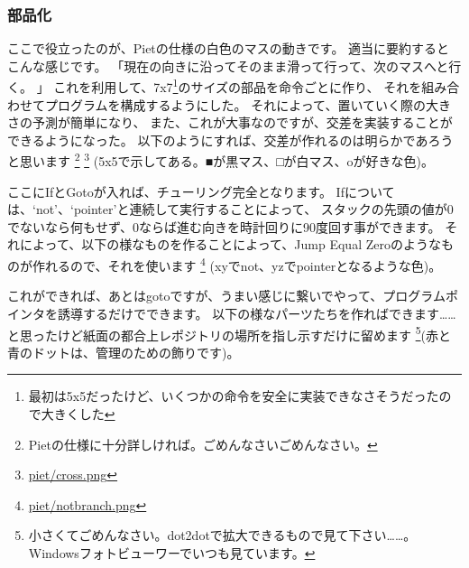 \documentclass[twocolumn,8pt,b5paper]{extarticle}
\begin{document}
\subsubsection{部品化}
ここで役立ったのが、Pietの仕様の白色のマスの動きです。 
適当に要約するとこんな感じです。
「現在の向きに沿ってそのまま滑って行って、次のマスへと行く。 」
これを利用して、7x7\footnote{最初は5x5だったけど、いくつかの命令を安全に実装できなさそうだったので大きくした}のサイズの部品を命令ごとに作り、 
それを組み合わせてプログラムを構成するようにした。 それによって、置いていく際の大きさの予測が簡単になり、 
また、これが大事なのですが、交差を実装することができるようになった。 以下のようにすれば、交差が作れるのは明らかであろうと思います 
\footnote{Pietの仕様に十分詳しければ。ごめんなさいごめんなさい。} 
\footnote{\href{https://github.com/nna774/piet-automata/blob/master/piet/cross.png}{piet/cross.png}} (5x5で示してある。■が黒マス、□が白マス、oが好きな色)。

\hfil{}\hfil

ここにIfとGotoが入れば、チューリング完全となります。
Ifについては、`not'、`pointer'と連続して実行することによって、
スタックの先頭の値が0でないなら何もせず、0ならば進む向きを時計回りに90度回す事ができます。
それによって、以下の様なものを作ることによって、Jump Equal Zeroのようなものが作れるので、それを使います
\footnote{\href{https://github.com/nna774/piet-automata/blob/master/piet/notbranch.png}{piet/notbranch.png}}
(xyでnot、yzでpointerとなるような色)。

\hfil{}\hfil

これができれば、あとはgotoですが、うまい感じに繋いでやって、プログラムポインタを誘導するだけでできます。
以下の様なパーツたちを作ればできます……と思ったけど紙面の都合上レポジトリの場所を指し示すだけに留めます
\footnote{小さくてごめんなさい。dot2dotで拡大できるもので見て下さい……。Windowsフォトビューワーでいつも見ています。}(赤と青のドットは、管理のための飾りです)。
\end{document}
